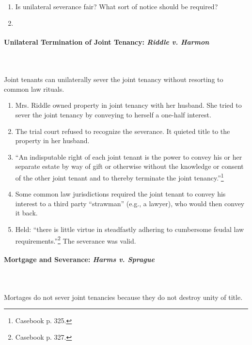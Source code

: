 \begin{enumerate}
    \item Is unilateral severance fair? What sort of notice should be 
    required?
    \item %
\end{enumerate}

\paragraph{Unilateral Termination of Joint Tenancy: \emph{Riddle v. Harmon}}
~\\\\
Joint tenants can unilaterally sever the joint tenancy without resorting to 
common law rituals.

\begin{enumerate}
    \item Mrs. Riddle owned property in joint tenancy with her husband. She 
    tried to sever the joint tenancy by conveying to herself a one-half 
    interest.
    \item The trial court refused to recognize the severance. It quieted title 
    to the property in her husband.
    \item ``An indisputable right of each joint tenant is the power to convey 
    his or her separate estate by way of gift or otherwise without the 
    knowledge or consent of the other joint tenant and to thereby terminate 
    the joint tenancy.''\footnote{Casebook p. 325.}
    \item Some common law jurisdictions required the joint tenant to convey 
    his interest to a third party ``strawman'' (e.g., a lawyer), who would 
    then convey it back.
    \item Held: ``there is little virtue in steadfastly adhering to cumbersome 
    feudal law requirements.''\footnote{Casebook p. 327.} The severance was 
    valid.
\end{enumerate}

\paragraph{Mortgage and Severance: \emph{Harms v. Sprague}}
~\\\\
Mortages do not sever joint tenancies because they do not destroy unity of 
title.

